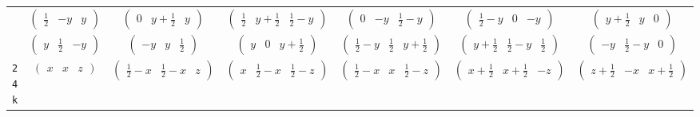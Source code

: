 \documentclass[fleqn,9pt,landscape]{jsarticle}
\begin{document}
\begin{center}
\begin{longtable}{ccccccc}
& $ \begin{pmatrix} \frac{1}{2} & - y & y \end{pmatrix} $ & $ \begin{pmatrix} 0 & y + \frac{1}{2} & y \end{pmatrix} $ & $ \begin{pmatrix} \frac{1}{2} & y + \frac{1}{2} & \frac{1}{2} - y \end{pmatrix} $ & $ \begin{pmatrix} 0 & - y & \frac{1}{2} - y \end{pmatrix} $ & $ \begin{pmatrix} \frac{1}{2} - y & 0 & - y \end{pmatrix} $ & $ \begin{pmatrix} y + \frac{1}{2} & y & 0 \end{pmatrix} $ \\
& $ \begin{pmatrix} y & \frac{1}{2} & - y \end{pmatrix} $ & $ \begin{pmatrix} - y & y & \frac{1}{2} \end{pmatrix} $ & $ \begin{pmatrix} y & 0 & y + \frac{1}{2} \end{pmatrix} $ & $ \begin{pmatrix} \frac{1}{2} - y & \frac{1}{2} & y + \frac{1}{2} \end{pmatrix} $ & $ \begin{pmatrix} y + \frac{1}{2} & \frac{1}{2} - y & \frac{1}{2} \end{pmatrix} $ & $ \begin{pmatrix} - y & \frac{1}{2} - y & 0 \end{pmatrix} $ \\ \hline
{\tt 24k} & $ \begin{pmatrix} x & x & z \end{pmatrix} $ & $ \begin{pmatrix} \frac{1}{2} - x & \frac{1}{2} - x & z \end{pmatrix} $ & $ \begin{pmatrix} x & \frac{1}{2} - x & \frac{1}{2} - z \end{pmatrix} $ & $ \begin{pmatrix} \frac{1}{2} - x & x & \frac{1}{2} - z \end{pmatrix} $ & $ \begin{pmatrix} x + \frac{1}{2} & x + \frac{1}{2} & - z \end{pmatrix} $ & $ \begin{pmatrix} z + \frac{1}{2} & - x & x + \frac{1}{2} \end{pmatrix} $ \\

\end{longtable}
\end{center}
\end{document}
